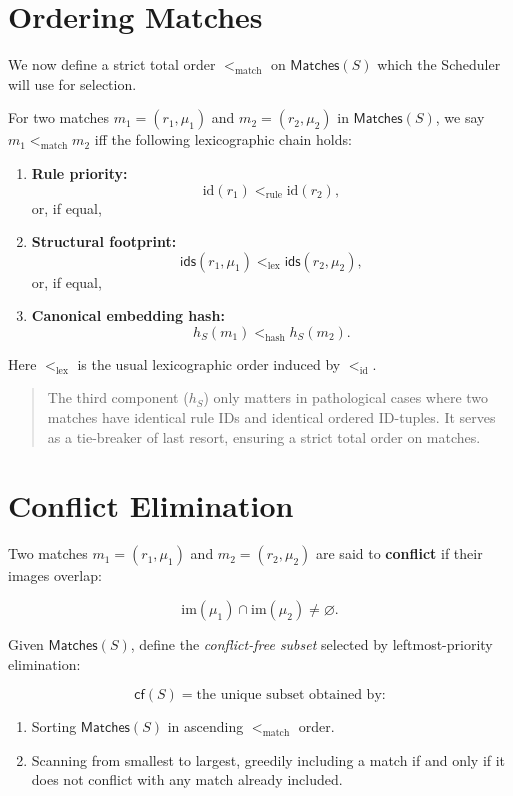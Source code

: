 \section{Ordering Matches}

We now define a strict total order $<_{\text{match}}$ on $\mathsf{Matches}(S)$
which the Scheduler will use for selection.

For two matches $m_1=(r_1,\mu_1)$ and $m_2=(r_2,\mu_2)$ in $\mathsf{Matches}(S)$,
we say $m_1 <_{\text{match}} m_2$ iff the following lexicographic chain holds:

\begin{enumerate}
    \item \textbf{Rule priority:}
          \[
          \mathrm{id}(r_1) <_{\text{rule}} \mathrm{id}(r_2),
          \]
          or, if equal,
    \item \textbf{Structural footprint:}
          \[
          \mathsf{ids}(r_1,\mu_1) <_{\text{lex}} \mathsf{ids}(r_2,\mu_2),
          \]
          or, if equal,
    \item \textbf{Canonical embedding hash:}
          \[
          h_S(m_1) <_{\text{hash}} h_S(m_2).
          \]
\end{enumerate}

Here $<_{\text{lex}}$ is the usual lexicographic order induced by $<_{\text{id}}$.

\begin{quote}
The third component ($h_S$) only matters in pathological cases where two matches
have identical rule IDs and identical ordered ID-tuples. It serves as a
tie-breaker of last resort, ensuring a strict total order on matches.
\end{quote}

\section{Conflict Elimination}

Two matches $m_1 = (r_1, \mu_1)$ and $m_2 = (r_2, \mu_2)$ are said to
\textbf{conflict} if their images overlap:

\[
\mathrm{im}(\mu_1) \cap \mathrm{im}(\mu_2) \neq \varnothing.
\]

Given $\mathsf{Matches}(S)$, define the \emph{conflict-free subset} selected
by leftmost-priority elimination:

\[
\mathsf{cf}(S) = \text{the unique subset obtained by:}
\]

\begin{enumerate}
    \item Sorting $\mathsf{Matches}(S)$ in ascending $<_{\text{match}}$ order.
    \item Scanning from smallest to largest, greedily including a match if and only if
          it does not conflict with any match already included.
\end{enumerate}

